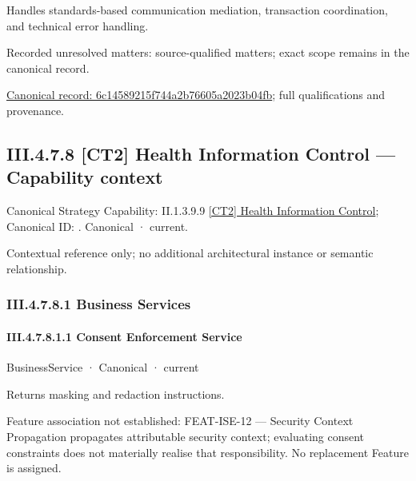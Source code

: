 Handles standards-based communication mediation, transaction coordination, and technical error handling.


{\small Recorded unresolved matters: source-qualified matters; exact scope remains in the canonical record.}\par
{\footnotesize \href{../../../../continuum/business/business-function/6c14589215f744a2b76605a2023b04fb.md}{Canonical record: 6c14589215f744a2b76605a2023b04fb}; full qualifications and provenance.}\par
\subsection*{III.4.7.8 [CT2] Health Information Control — Capability context}
\label{navigation:III.4.7.8}

{\small Canonical Strategy Capability: II.1.3.9.9 \hyperref[element:44cc0e17ad534675bf26dce6e46a68ff]{[CT2] Health Information Control}; Canonical ID: \texttt{}. Canonical · current.}\par
Contextual reference only; no additional architectural instance or semantic relationship.\par
\subsubsection*{III.4.7.8.1 Business Services}
\label{navigation:III.4.7.8.1}

\paragraph*{III.4.7.8.1.1 Consent Enforcement Service}
\label{navigation:III.4.7.8.1.1}

\label{element:67bf392d2dd6464292619e259cc37f8e}
{\small BusinessService · Canonical · current}\par

Returns masking and redaction instructions.



Feature association not established: FEAT-ISE-12 — Security Context Propagation propagates attributable security context; evaluating consent constraints does not materially realise that responsibility. No replacement Feature is assigned.


